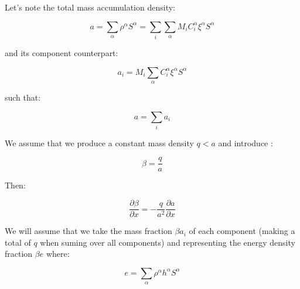 \documentclass{article}
\begin{document}
Let's note the total mass accumulation density:

$$
a = \sum_\alpha \rho^ \alpha S^\alpha = \sum_i \sum_\alpha M_i  C^\alpha_i \xi^\alpha S^\alpha
$$

and its component counterpart:


$$
a_i = M_i  \sum_\alpha C^\alpha_i \xi^\alpha S^\alpha
$$

such that:

$$
a= \sum_i a_i
$$

We assume that we produce a constant mass density $q<a$  and introduce :

$$
\beta=\frac{q}{a}
$$

Then:

$$
\frac{\partial \beta}{\partial x} = -\frac{q}{a^2}\frac{\partial a}{\partial x}
$$

We will assume that we take the mass fraction $\beta a_i$ of each component (making a total of $q$ when suming over all components) and representing the energy density fraction $\beta e$ where:

$$
e = \sum_\alpha \rho^ \alpha h^\alpha S^\alpha
$$
\end{document}
